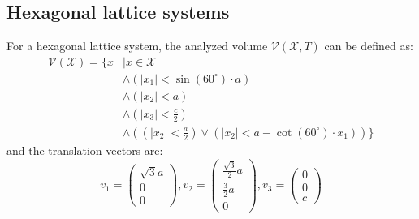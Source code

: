   \subsection{Hexagonal lattice systems}
  For a hexagonal lattice system, the analyzed volume $\mathcal{V}(\mathcal{X},T)$ can be defined as:
  \begin{align*}\mathcal{V}(\mathcal{X}) = \{x &| x \in \mathcal{X} \\ &\land (|x_1| < \sin(60^\circ)\cdot a)\\ &\land (|x_2| < a) \\ &\land (|x_3| < \frac{c}{2}) \\ &\land ((|x_2| < \frac{a}{2}) \lor (|x_2| < a - \cot(60^\circ) \cdot x_1))\}\end{align*}
  and the translation vectors are:
  \begingroup
  \renewcommand*{\arraystretch}{1.2}
  \[
  v_1 = \begin{pmatrix}\sqrt{3}a\\0\\0\end{pmatrix},
  v_2 = \begin{pmatrix}\frac{\sqrt{3}}{2}a\\\frac{3}{2}a\\0\end{pmatrix},
  v_3 = \begin{pmatrix}0\\0\\c\end{pmatrix}
  \]
  \endgroup
